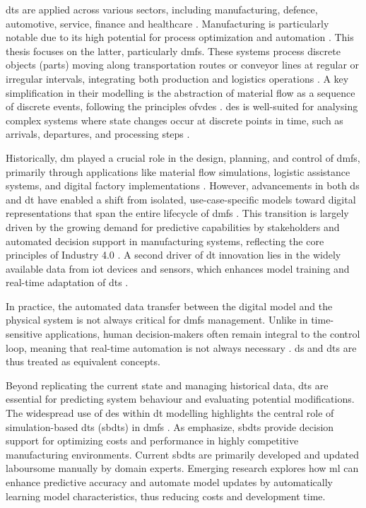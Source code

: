 \gls{dt}s are applied across various sectors, including manufacturing, defence, automotive, service, finance and healthcare \autocite{Tao2018ijamt}. Manufacturing is particularly notable due to its high potential for process optimization and automation \autocite{Tao2018ijamt}. This thesis focuses on the latter, particularly \gls{dmfs}. These systems process discrete objects (parts) moving along transportation routes or conveyor lines at regular or irregular intervals, integrating both production and logistics operations \autocite{arnold2005materialfluss, schwede2024learning}. A key simplification in their modelling is the abstraction of material flow as a sequence of discrete events, following the principles ofv\gls{des} \autocite{kovacs2016mathematical, robinson2014simulation}. \gls{des} is well-suited for analysing complex systems where state changes occur at discrete points in time, such as arrivals, departures, and processing steps \autocite{robinson2014simulation}.

Historically, \gls{dm} played a crucial role in the design, planning, and control of \gls{dmfs}, primarily through applications like material flow simulations, logistic assistance systems, and digital factory implementations \autocite{Thiede2013}. However, advancements in both \gls{ds} and \gls{dt} have enabled a shift from isolated, use-case-specific models toward digital representations that span the entire lifecycle of \gls{dmfs} \autocite{Abdoune2023}. This transition is largely driven by the growing demand for predictive capabilities by stakeholders and automated decision support in manufacturing systems,
reflecting the core principles of Industry 4.0 \autocite{frank2019industry}. A second driver of \gls{dt} innovation lies in the widely available data from \gls{iot} devices and sensors, which enhances model training and real-time adaptation of \gls{dt}s \autocite{Tao2018ijamt}.

In practice, the automated data transfer between the digital model and the physical system is not always critical for \gls{dmfs} management. Unlike in time-sensitive applications, human decision-makers often remain integral to the control loop, meaning that real-time automation is not always necessary \autocite{schwede2024learning}. \gls{ds} and \gls{dt}s are thus treated as equivalent concepts.

Beyond replicating the current state and managing historical data, \gls{dt}s are essential for predicting system behaviour and evaluating potential modifications. The widespread use of \gls{des} within \gls{dt} modelling highlights the central role of simulation-based \gls{dt}s (\gls{sbdt}s) in \gls{dmfs} \autocite{Lugaresi2021aifac}. As \textcite{schwede2024learning} emphasize, \gls{sbdt}s provide decision support for optimizing costs and performance in highly competitive manufacturing environments. Current \gls{sbdt}s are primarily developed and updated laboursome manually by domain experts. Emerging research explores how \gls{ml} can enhance predictive accuracy and automate model updates by automatically learning model characteristics, thus reducing costs and development time.

